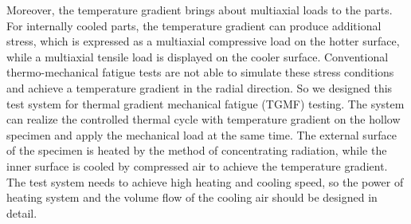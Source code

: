 Moreover, the temperature gradient brings about multiaxial loads to the parts.
For internally cooled parts, the temperature gradient can produce additional stress, which is expressed as a multiaxial compressive load on the hotter surface, while a multiaxial tensile load is displayed on the cooler surface.
Conventional thermo-mechanical fatigue tests are not able to simulate these stress conditions and achieve a temperature gradient in the radial direction. So we designed this test system for thermal gradient mechanical fatigue (TGMF) testing.
The system can realize the controlled thermal cycle with temperature gradient on the hollow specimen and apply the mechanical load at the same time.
The external surface of the specimen is heated by the method of concentrating radiation, while the inner surface is cooled by compressed air to achieve the temperature gradient.
The test system needs to achieve high heating and cooling speed, so the power of heating system and the volume flow of the cooling air should be designed in detail.


%


